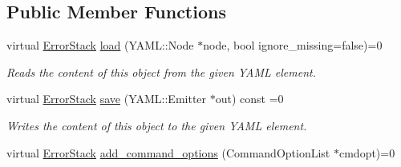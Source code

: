 \subsection*{Public Member Functions}
\begin{DoxyCompactItemize}
\item 
virtual \hyperlink{classalps_1_1ErrorStack}{Error\+Stack} \hyperlink{structalps_1_1Externalizable_a3f29cb41a5b5201a1316480087902eed}{load} (Y\+A\+M\+L\+::\+Node $\ast$node, bool ignore\+\_\+missing=false)=0
\begin{DoxyCompactList}\small\item\em Reads the content of this object from the given Y\+A\+ML element. \end{DoxyCompactList}\item 
virtual \hyperlink{classalps_1_1ErrorStack}{Error\+Stack} \hyperlink{structalps_1_1Externalizable_a17a3cdc895ad343d18fd37ff6efd0aef}{save} (Y\+A\+M\+L\+::\+Emitter $\ast$out) const =0
\begin{DoxyCompactList}\small\item\em Writes the content of this object to the given Y\+A\+ML element. \end{DoxyCompactList}\item 
virtual \hyperlink{classalps_1_1ErrorStack}{Error\+Stack} \hyperlink{structalps_1_1Externalizable_a208181477d819b3023ce80c60d54a730}{add\+\_\+command\+\_\+options} (Command\+Option\+List $\ast$cmdopt)=0\hypertarget{structalps_1_1Externalizable_a208181477d819b3023ce80c60d54a730}{}\label{structalps_1_1Externalizable_a208181477d819b3023ce80c60d54a730}


\end{DoxyCompactItemize}
